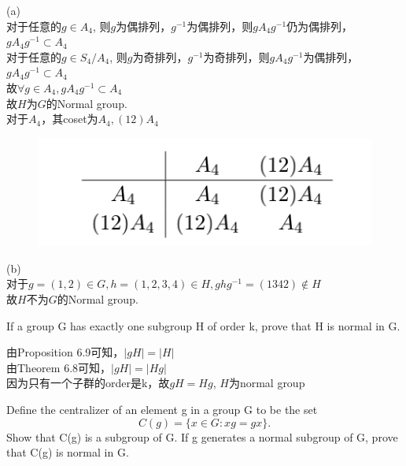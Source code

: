 \documentclass[a4paper, justified]{tufte-handout}
\begin{document}
\begin{solution}
(a)\\
对于任意的$g \in A_4$, 则$g$为偶排列，$g^{-1}$为偶排列，则$gA_4g^{-1}$仍为偶排列，$gA_4g^{-1}\subset A_4$\\
对于任意的$g \in S_4/A_4$, 则$g$为奇排列，$g^{-1}$为奇排列，则$gA_4g^{-1}$为偶排列，$gA_4g^{-1}\subset A_4$\\
故$\forall g \in A_4, gA_4g^{-1}\subset A_4$\\
故$H$为$G$的Normal group.\\
对于$A_4$，其coset为$A_4, (12)A_4$\\
\begin{figure}[htbp]
    \centering
    \includegraphics[width = 0.30\linewidth]{figs/a}
  \end{figure}
 (b)\\
对于$g=(1,2)\in G, h = (1,2,3,4)\in H, ghg^{-1}=(1342)\notin H$\\
故$H$不为$G$的Normal group.\\
\end{solution}

\begin{problem}[TJ 10-11]
If a group G has exactly one subgroup H of order k, prove that H is normal in G.
\end{problem}

\begin{solution}
由Proposition 6.9可知，$|gH|=|H|$\\
由Theorem 6.8可知，$|gH|=|Hg|$\\
因为只有一个子群的order是k，故$gH=Hg$, $H$为normal group
\end{solution}


\begin{problem}[TJ 10-12]
Define the centralizer of an element g in a group G to be the set 
\[
C(g) = \{x \in G : xg = gx\}.
\]
Show that C(g) is a subgroup of G. If g generates a normal subgroup of G, prove that C(g) is normal in G.
\end{problem}
\end{document}
